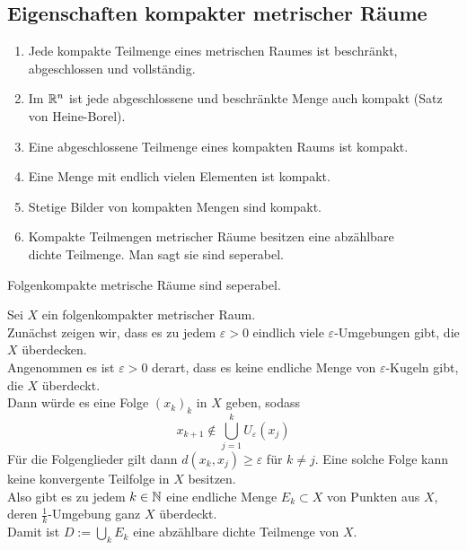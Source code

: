 \documentclass[../ana2u.tex]{subfiles}
\begin{document}
\subsection{Eigenschaften kompakter metrischer Räume}
    \begin{enumerate}
        \item Jede kompakte Teilmenge 
        eines metrischen Raumes ist 
        beschränkt, abgeschlossen und 
        vollständig.
        \item Im \(\mathbb{R}^n\) ist jede abgeschlossene und 
        beschränkte Menge auch kompakt
        (Satz von Heine-Borel).
        \item Eine abgeschlossene Teilmenge 
        eines kompakten Raums ist kompakt.
        \item Eine Menge mit endlich 
        vielen Elementen ist kompakt.
        \item Stetige Bilder von kompakten Mengen sind
        kompakt.
        \item Kompakte Teilmengen metrischer Räume besitzen
        eine abzählbare\\dichte Teilmenge. Man sagt sie
        sind seperabel.
    \end{enumerate}
    \begin{beh}
        Folgenkompakte metrische Räume sind 
        seperabel.
    \end{beh}
    \begin{bew}
        Sei \(X\) ein folgenkompakter metrischer Raum.\\
        Zunächst zeigen wir, dass es zu jedem 
        \(\varepsilon > 0\) eindlich viele 
        \( \varepsilon \)-Umgebungen gibt, die \(X\) 
        überdecken. \\
        Angenommen es ist \(\varepsilon > 0\) derart, dass
        es keine endliche Menge von \(\varepsilon\)-Kugeln
        gibt, die \(X\) überdeckt.\\
        Dann würde es eine Folge \( (x_k)_k \) in \(X\) 
        geben, sodass 
        \[ x_{k+1} \notin \bigcup_{j=1}^k U_\varepsilon(x_j) \]
        Für die Folgenglieder gilt dann 
        \( d(x_k, x_j) \geq \varepsilon \) für 
        \( k \neq j \).
        Eine solche Folge kann keine konvergente 
        Teilfolge in \(X\) besitzen. \Lightning{} \\
        Also gibt es zu jedem \(k \in \mathbb{N}\) eine endliche 
        Menge \(E_k \subset X\) von Punkten aus \(X\),
        deren \(\frac{1}{k}\)-Umgebung
        ganz \( X \) überdeckt.\\
        Damit ist \( D := \bigcup_k E_k \) eine abzählbare 
        dichte Teilmenge von \(X\).
    \end{bew}
\end{document}
